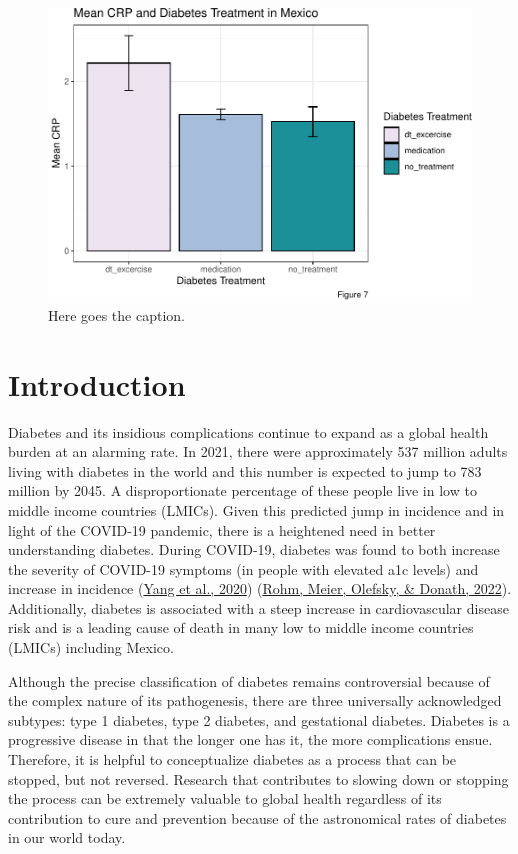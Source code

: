 \documentclass[
  man]{apa6}
\begin{document}
\begin{figure}
\centering
\includegraphics{NEW_Final_Groupof5_files/figure-latex/treat-fig-1.pdf}
\caption{\label{fig:treat-fig}Here goes the caption.}
\end{figure}



\hypertarget{introduction}{%
\section{Introduction}\label{introduction}}

Diabetes and its insidious complications continue to expand as a global health burden at an alarming rate. In 2021, there were approximately 537 million adults living with diabetes in the world and this number is expected to jump to 783 million by 2045. A disproportionate percentage of these people live in low to middle income countries (LMICs). Given this predicted jump in incidence and in light of the COVID-19 pandemic, there is a heightened need in better understanding diabetes. During COVID-19, diabetes was found to both increase the severity of COVID-19 symptoms (in people with elevated a1c levels) and increase in incidence (\protect\hyperlink{ref-yangPrevalenceComorbiditiesIts2020}{Yang et al., 2020}) (\protect\hyperlink{ref-rohmInflammationObesityDiabetes2022}{Rohm, Meier, Olefsky, \& Donath, 2022}). Additionally, diabetes is associated with a steep increase in cardiovascular disease risk and is a leading cause of death in many low to middle income countries (LMICs) including Mexico.

Although the precise classification of diabetes remains controversial because of the complex nature of its pathogenesis, there are three universally acknowledged subtypes: type 1 diabetes, type 2 diabetes, and gestational diabetes. Diabetes is a progressive disease in that the longer one has it, the more complications ensue. Therefore, it is helpful to conceptualize diabetes as a process that can be stopped, but not reversed. Research that contributes to slowing down or stopping the process can be extremely valuable to global health regardless of its contribution to cure and prevention because of the astronomical rates of diabetes in our world today.
\end{document}
